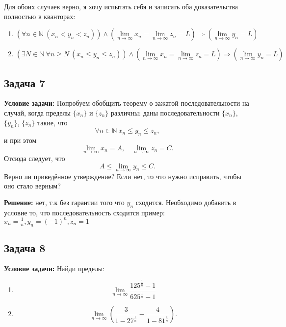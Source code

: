 \documentclass[a4paper,12pt]{article}
\begin{document}
Для обоих случаев верно, я хочу испытать себя и записать оба доказательства полностью в кванторах:

\begin{enumerate}
    \item   \[
            \left( \forall n \in \mathbb{N}\ (x_n < y_n < z_n) \right) \wedge \left( \lim_{n \to \infty} x_n = \lim_{n \to \infty} z_n = L \right) \Rightarrow \left( \lim_{n \to \infty} y_n = L \right)
            \]
    \item   \[
            \left( \exists N \in \mathbb{N}\ \forall n \geq N\ (x_n \leq y_n \leq z_n) \right) \wedge \left( \lim_{n \to \infty} x_n = \lim_{n \to \infty} z_n = L \right) \Rightarrow \left( \lim_{n \to \infty} y_n = L \right)
            \]
\end{enumerate}

\vspace{1cm}

\subsection{Задача 7}


\textbf{Условие задачи:}
Попробуем обобщить теорему о зажатой последовательности на случай, когда пределы $\{x_n\}$ и $\{z_n\}$ различны: даны последовательности $\{x_n\}$, $\{y_n\}$, $\{z_n\}$ такие, что
\[
\forall n \in \mathbb{N}\ x_n \leq y_n \leq z_n,
\]
и при этом
\[
\lim_{n \to \infty} x_n = A, \quad \lim_{n \to \infty} z_n = C.
\]
Отсюда следует, что
\[
A \leq \lim_{n \to \infty} y_n \leq C.
\]
Верно ли приведённое утверждение? Если нет, то что нужно исправить, чтобы оно стало верным?

\textbf{Решение:}
нет, т.к без гарантии того что $y_n$ сходится. Необходимо добавить в условие то, что последовательность сходится
пример: $x_n = \frac{1}{n}, y_n = (-1)^n, z_n = 1$
\vspace{1cm}

\subsection{Задача 8}


\textbf{Условие задачи:}
Найди пределы:
\begin{enumerate}[а)]
    \item \[
    \lim_{n \to \infty} \frac{125^{\frac{1}{n}}-1}{625^{\frac{1}{n}}-1}
    \]
    \item \[
    \lim_{n \to \infty} \left(\frac{3}{1-27^{\frac{1}{n}}}-\frac{4}{1-81^{\frac{1}{n}}} \right).
    \]
\end{enumerate}
\end{document}
